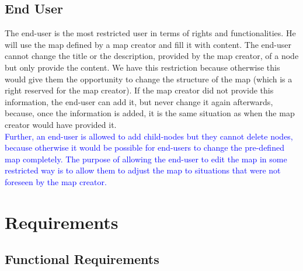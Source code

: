 \subsection{End User}\label{sec:user-class-end-user}
The end-user is the most restricted user in terms of rights and functionalities. He will use the map defined by a map creator and fill it with content. The end-user cannot change the title or the description, provided by the map creator, of a node but only provide the content. We have this restriction because otherwise this would give them the opportunity to change the structure of the map (which is a right reserved for the map creator). If the map creator did not provide this information, the end-user can add it, but never change it again afterwards, because, once the information is added, it is the same situation as when the map creator would have provided it.\\

\textcolor{blue}{
Further, an end-user is allowed to add child-nodes but they cannot delete nodes, because otherwise it would be possible for end-users to change the pre-defined map completely. The purpose of allowing the end-user to edit the map in some restricted way is to allow them to adjust the map to situations that were not foreseen by the map creator.
}



\section{Requirements}\label{sec:requirements}

\subsection{Functional Requirements}\label{sec:functional-requirements}

